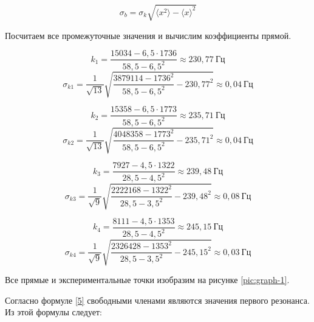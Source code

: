 \documentclass[a4paper,12pt]{article}
\begin{document}
\begin{equation}
    \sigma_b = \sigma_k\sqrt{\langle x^2 \rangle - \langle x \rangle^2}
\end{equation}

Посчитаем все промежуточные значения и вычислим коэффициенты прямой.

\begin{equation*}
    k_1 = \frac{15034 - 6,5 \cdot 1736}{58,5 - {6,5}^2} \approx 230,77 \ \text{Гц}
\end{equation*}
\begin{equation*}
    \sigma_{k1} = \frac{1}{\sqrt{13}} \sqrt{\frac{3879114 - {1736}^2}{58,5 - {6,5}^2} - {230,77}^2} \approx 0,04 \ \text{Гц}
\end{equation*}



\begin{equation*}
    k_2 = \frac{15358 - 6,5 \cdot 1773}{58,5 - {6,5}^2} \approx 235,71 \ \text{Гц}
\end{equation*}
\begin{equation*}
    \sigma_{k2} = \frac{1}{\sqrt{13}} \sqrt{\frac{4048358 - {1773}^2}{58,5 - {6,5}^2} - {235,71}^2} \approx 0,04 \ \text{Гц}
\end{equation*}



\begin{equation*}
    k_3 = \frac{7927 - 4,5 \cdot 1322}{28,5 - {4,5}^2} \approx 239,48 \ \text{Гц}
\end{equation*}
\begin{equation*}
    \sigma_{k3} = \frac{1}{\sqrt{9}} \sqrt{\frac{2222168 - {1322}^2}{28,5 - {3,5}^2} - {239,48}^2} \approx 0,08 \ \text{Гц}
\end{equation*}



\begin{equation*}
    k_4 = \frac{8111 - 4,5 \cdot 1353}{28,5 - {4,5}^2} \approx 245,15 \ \text{Гц}
\end{equation*}
\begin{equation*}
    \sigma_{k4} = \frac{1}{\sqrt{9}} \sqrt{\frac{2326428 - {1353}^2}{28,5 - {3,5}^2} - {245,15}^2} \approx 0,03 \ \text{Гц}
\end{equation*}

Все прямые и экспериментальные точки изобразим на рисунке \ref{pic:graph-1}.

Согласно формуле \eqref{5} свободными членами являются значения первого резонанса. Из этой формулы следует:
\end{document}
